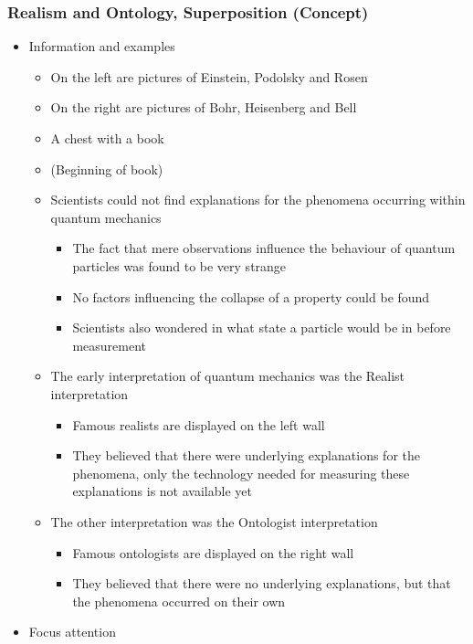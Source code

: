 \documentclass[11pt,twoside]{report} %
\begin{document}
\subsubsection{Realism and Ontology, Superposition (Concept)}
	\begin{itemize}
		\item Information and examples
		\begin{itemize}
			\item On the left are pictures of Einstein, Podolsky and Rosen
			\item On the right are pictures of Bohr, Heisenberg and Bell
			\item A chest with a book
			\item (Beginning of book)
			\item Scientists could not find explanations for the phenomena occurring within quantum mechanics
			\begin{itemize}
				\item The fact that mere observations influence the behaviour of quantum particles was found to be very strange
				\item No factors influencing the collapse of a property could be found
				\item Scientists also wondered in what state a particle would be in before measurement
			\end{itemize}
			\item The early interpretation of quantum mechanics was the Realist interpretation
			\begin{itemize}
				\item Famous realists are displayed on the left wall
				\item They believed that there were underlying explanations for the phenomena, only the technology needed for measuring these explanations is not available yet
			\end{itemize}
			\item The other interpretation was the Ontologist interpretation
			\begin{itemize}
				\item Famous ontologists are displayed on the right wall
				\item They believed that there were no underlying explanations, but that the phenomena occurred on their own
			\end{itemize}
		\end{itemize}
		\item Focus attention
		\begin{itemize}

\end{itemize}
\end{itemize}
\end{document}
